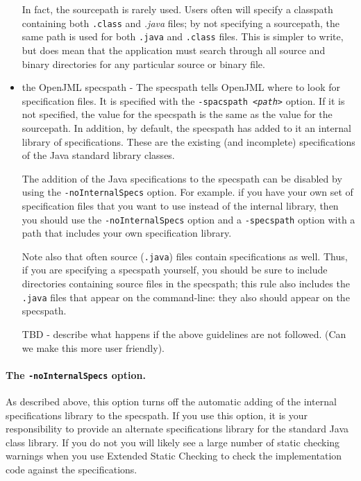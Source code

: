 \documentclass{report}%
\begin{document}
\begin{itemize}
In fact, the sourcepath is rarely used.  Users often will specify a classpath containing both {\tt .class} and {\it .java} files; by 
not specifying a sourcepath, the same path is used for both {\tt .java} and {\tt .class} files. This is simpler to write, but does mean
that the application must search through all source and binary directories for any particular source or binary file.

\item the OpenJML specspath - The specspath tells OpenJML where to look for specification files. It is specified with the {\tt -spacspath {\it <path>}} option. If it is not specified, the value for the specspath is the same as the value for the sourcepath.  In addition, by default, the specspath
has added to it an internal library of specifications.  These are the existing (and incomplete) specifications of the Java standard library classes.

The addition of the Java specifications to the specspath can be disabled by using the {\tt -noInternalSpecs} option.  For example. if you
have your own set of specification files that you want to use instead of the internal library, then you should use the {\tt -noInternalSpecs} option and a {\tt -specspath} option with a path that includes your own specification library.

Note also that often source ({\tt .java}) files contain specifications as well. Thus, if you are specifying a specspath yourself, you should
be sure to include directories containing source files in the specspath; this rule also includes the {\tt .java} files that appear on the 
command-line: they also should appear on the specspath.

TBD - describe what happens if the above guidelines are not followed. (Can we make this more user friendly).

\end{itemize}

\paragraph{The {\tt -noInternalSpecs} option.} As described above, this option turns off the automatic adding of the internal specifications library to the specspath. If you use this option, it is your responsibility to provide an alternate specifications library for the standard
Java class library. If you do not you will likely see a large number of static checking warnings when you use Extended Static Checking to check the implementation code against the specifications.
\end{document}
